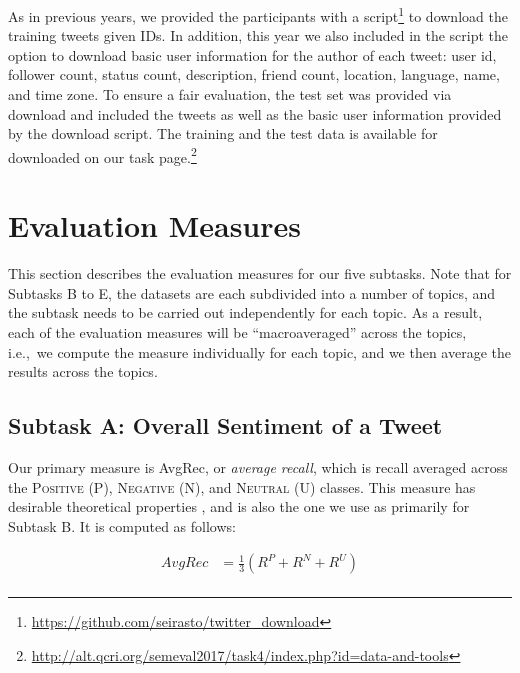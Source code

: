 \documentclass[11pt,a4paper]{article}
\begin{document}
As in previous years, we provided the participants with a script\footnote{\url{https://github.com/seirasto/twitter_download}} to download the training tweets given IDs. In addition, this year we also included in the script the option to download basic user information for the author of each tweet: user id, follower count, status count, description, friend count, location, language, name, and time zone. To ensure a fair evaluation, the test set was provided via download and included the tweets as well as the basic user information provided by the download script. The training and the test data is available for downloaded on our task page.\footnote{\url{http://alt.qcri.org/semeval2017/task4/index.php?id=data-and-tools}}

\section{Evaluation Measures}
\label{sec:eval}


This section describes the evaluation measures for our five subtasks. Note that for Subtasks B to E, the datasets are each subdivided into a number of topics, and the subtask needs to be carried out independently for each topic. As a
result, each of the evaluation measures will be ``macroaveraged'' across the topics, i.e.,~we compute the measure
individually for each topic, and we then average the results across the topics.


\subsection{Subtask A: Overall Sentiment of a Tweet} 

Our primary measure is AvgRec, or \emph{average recall}, which is recall averaged across the \textsc{Positive} (P), \textsc{Negative} (N), and \textsc{Neutral} (U) classes. This measure has desirable theoretical properties \cite{Sebastiani:2015zl}, and is also the one we use as primarily for Subtask B.
It is computed as follows:

\begin{equation}
  \begin{aligned}
 	  \label{eq:rho}
   AvgRec & = \frac{1}{3}(R^{P}+R^{N}+R^{U}) \\
  \end{aligned}
\end{equation}
\end{document}
